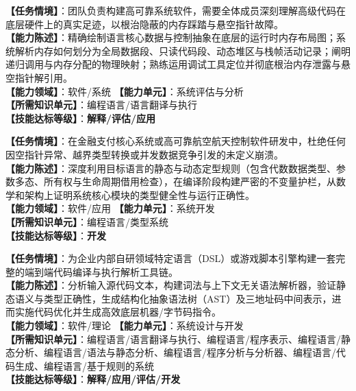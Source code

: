 \begin{taskbox}[任务 5：撰写技术白皮书深度剖析源码编译翻译与运行时内存执行的全流程机制]
\textbf{【任务情境】}：团队负责构建高可靠系统软件，需要全体成员深刻理解高级代码在底层硬件上的真实足迹，以根治隐蔽的内存踩踏与悬空指针故障。\\
\textbf{【能力陈述】}：精确绘制语言核心数据与控制抽象在底层的运行时内存布局图；系统解析内存如何划分为全局数据段、只读代码段、动态堆区与栈帧活动记录；阐明递归调用与内存分配的物理映射；熟练运用调试工具定位并彻底根治内存泄露与悬空指针解引用。\\
\textbf{【能力领域】}：软件/系统 \quad \textbf{【能力单元】}：系统评估与分析\\
\textbf{【所需知识单元】}：编程语言/语言翻译与执行\\
\textbf{【技能达标等级】}：\textbf{解释/评估/应用}
\end{taskbox}

\begin{taskbox}[任务 6：深度应用现代编程语言类型系统构建高安全健壮的软件工程]
\textbf{【任务情境】}：在金融支付核心系统或高可靠航空航天控制软件研发中，杜绝任何因空指针异常、越界类型转换或并发数据竞争引发的未定义崩溃。\\
\textbf{【能力陈述】}：深度利用目标语言的静态与动态定型规则（包含代数数据类型、参数多态、所有权与生命周期借用检查），在编译阶段构建严密的不变量护栏，从数学和架构上证明系统核心模块的类型健全性与运行正确性。\\
\textbf{【能力领域】}：软件/应用 \quad \textbf{【能力单元】}：系统开发\\
\textbf{【所需知识单元】}：编程语言/类型系统\\
\textbf{【技能达标等级】}：\textbf{开发}
\end{taskbox}

\begin{taskbox}
\textbf{【任务情境】}：为企业内部自研领域特定语言（DSL）或游戏脚本引擎构建一套完整的端到端代码编译与执行解析工具链。\\
\textbf{【能力陈述】}：分析输入源代码文本，构建词法与上下文无关语法解析器，验证静态语义与类型正确性，生成结构化抽象语法树（AST）及三地址码中间表示，进而实施代码优化并生成高效底层机器/字节码指令。\\
\textbf{【能力领域】}：软件/理论 \quad \textbf{【能力单元】}：系统设计与开发\\
\textbf{【所需知识单元】}：编程语言/语言翻译与执行、编程语言/程序表示、编程语言/静态分析、编程语言/语法与静态分析、编程语言/程序分析与分析器、编程语言/代码生成、编程语言/基于规则的系统\\
\textbf{【技能达标等级】}：\textbf{解释/应用/评估/开发}
\end{taskbox}

